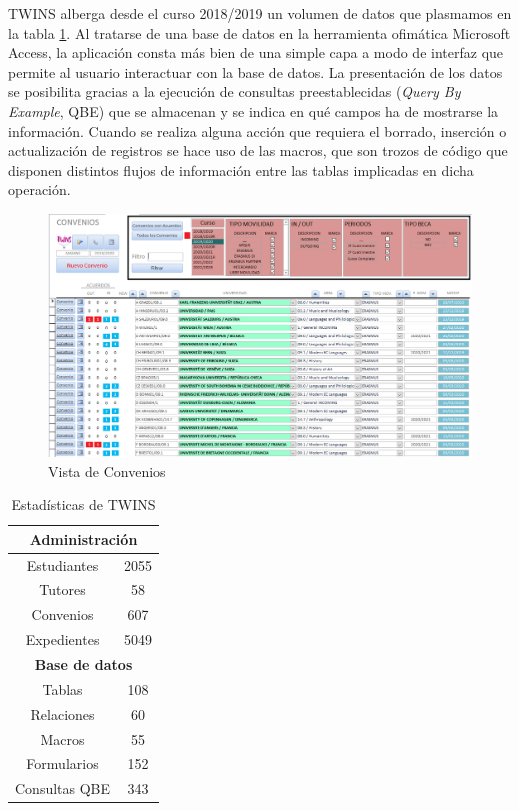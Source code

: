 TWINS alberga desde el curso 2018/2019 un volumen de datos que plasmamos en la tabla \ref{tab:estadisticasTWINS}. Al tratarse de una base de datos en la herramienta ofimática Microsoft Access\textregistered, la aplicación consta más bien de una simple capa a modo de interfaz que permite al usuario interactuar con la base de datos. La presentación de los datos se posibilita gracias a la ejecución de consultas preestablecidas (\textit{Query By Example}, QBE) que se almacenan y se indica en qué campos ha de mostrarse la información. Cuando se realiza alguna acción que requiera el borrado, inserción o actualización de registros se hace uso de las macros, que son trozos de código que disponen distintos flujos de información entre las tablas implicadas en dicha operación.

\begin{figure}
	\includegraphics[width=\textwidth]{img/Capturas de TWINS/vistaConvenios.png}
	\caption[Convenios]{Vista de Convenios}
	\label{fig:vistaConvenios}
\end{figure}

\begin{table}[h]
	\begin{center}
		\begin{tabular}{ | c | c | } 
			\hline
			\multicolumn{2}{|c|}{\textbf{Administración}} \\
			\hline
			Estudiantes \footnotemark & 2055 \\ 
			\hline
			Tutores & 58 \\
			\hline
			Convenios  & 607 \\ 
			\hline
			Expedientes & 5049 \\ 
			\hline
			\multicolumn{2}{|c|}{\textbf{Base de datos}} \\
			\hline
			Tablas & 108 \\
			\hline
			Relaciones & 60 \\
			\hline
			Macros & 55 \\
			\hline
			Formularios & 152 \\
			\hline
			Consultas QBE & 343 \\
			\hline
		\end{tabular}
		\caption{Estadísticas de TWINS}
		\label{tab:estadisticasTWINS}
	\end{center}
\end{table}~



